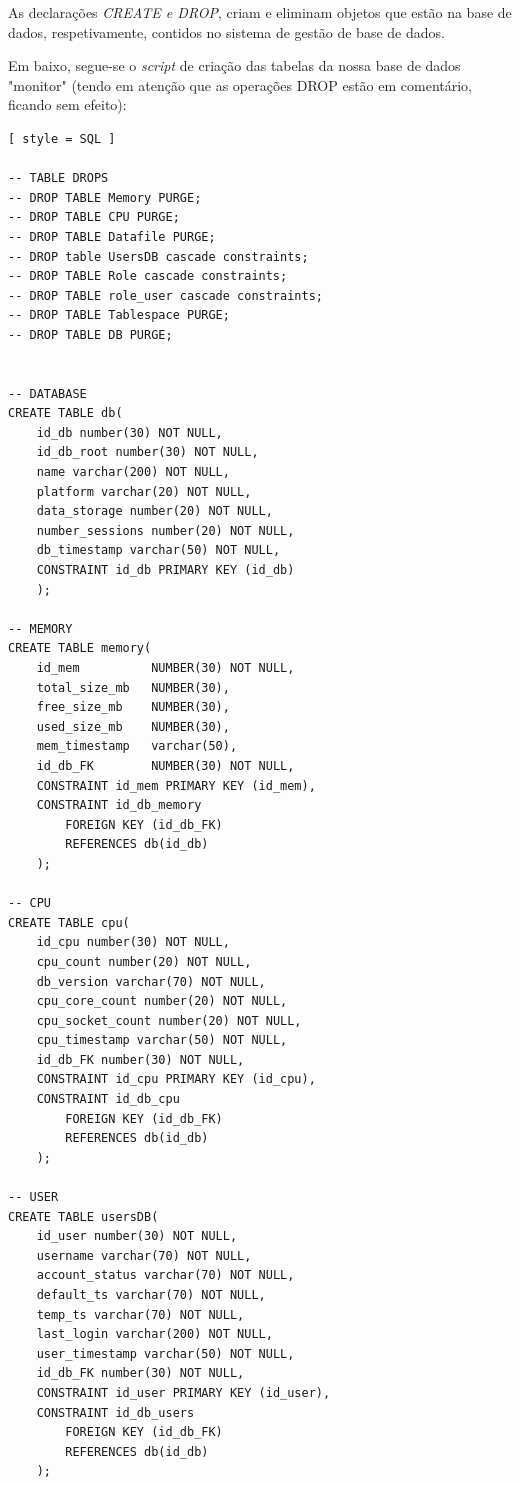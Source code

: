 \documentclass[a4paper]{article}
\begin{document}
As declarações \emph{CREATE e DROP}, criam e eliminam objetos que estão na base de dados, respetivamente, contidos no sistema de gestão de base de dados.

Em baixo, segue-se o \emph{script} de criação das tabelas da nossa base de dados "monitor" (tendo em atenção que as operações DROP estão em comentário, ficando sem efeito):

\begin{lstlisting}[ style = SQL ]
                    
-- TABLE DROPS
-- DROP TABLE Memory PURGE;
-- DROP TABLE CPU PURGE;
-- DROP TABLE Datafile PURGE;
-- DROP table UsersDB cascade constraints;
-- DROP TABLE Role cascade constraints;
-- DROP TABLE role_user cascade constraints;
-- DROP TABLE Tablespace PURGE;
-- DROP TABLE DB PURGE; 


-- DATABASE
CREATE TABLE db(
    id_db number(30) NOT NULL,
    id_db_root number(30) NOT NULL,
    name varchar(200) NOT NULL,
    platform varchar(20) NOT NULL,
    data_storage number(20) NOT NULL,
    number_sessions number(20) NOT NULL,
    db_timestamp varchar(50) NOT NULL,
    CONSTRAINT id_db PRIMARY KEY (id_db)
    );
    
-- MEMORY    
CREATE TABLE memory(
    id_mem          NUMBER(30) NOT NULL,
    total_size_mb   NUMBER(30),
    free_size_mb    NUMBER(30),
    used_size_mb    NUMBER(30),
    mem_timestamp   varchar(50),
    id_db_FK        NUMBER(30) NOT NULL,
    CONSTRAINT id_mem PRIMARY KEY (id_mem),
    CONSTRAINT id_db_memory
        FOREIGN KEY (id_db_FK)
        REFERENCES db(id_db)
    );
    
-- CPU
CREATE TABLE cpu(
    id_cpu number(30) NOT NULL,
    cpu_count number(20) NOT NULL,
    db_version varchar(70) NOT NULL,
    cpu_core_count number(20) NOT NULL,
    cpu_socket_count number(20) NOT NULL,
    cpu_timestamp varchar(50) NOT NULL,
    id_db_FK number(30) NOT NULL,
    CONSTRAINT id_cpu PRIMARY KEY (id_cpu),
    CONSTRAINT id_db_cpu
        FOREIGN KEY (id_db_FK)
        REFERENCES db(id_db)
    );

-- USER
CREATE TABLE usersDB(
    id_user number(30) NOT NULL,
    username varchar(70) NOT NULL,
    account_status varchar(70) NOT NULL,
    default_ts varchar(70) NOT NULL,
    temp_ts varchar(70) NOT NULL,
    last_login varchar(200) NOT NULL, 
    user_timestamp varchar(50) NOT NULL,
    id_db_FK number(30) NOT NULL,
    CONSTRAINT id_user PRIMARY KEY (id_user),
    CONSTRAINT id_db_users
        FOREIGN KEY (id_db_FK)
        REFERENCES db(id_db)
    );


\end{lstlisting}
\end{document}
